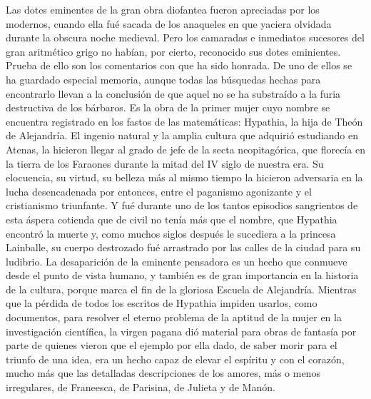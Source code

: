 \documentclass[a4paper, 12pt, draft]{article}
\begin{document}
{%






Las dotes eminentes de la gran obra diofantea fueron apreciadas por los modernos, cuando ella fué sacada de los anaqueles en que yaciera olvidada durante la obscura noche medieval. Pero los camaradas e inmediatos sucesores del gran aritmético grigo no habían, por cierto, reconocido sus dotes eminientes. Prueba de ello son los comentarios con que ha sido honrada. De uno de ellos se ha guardado especial memoria, aunque todas las búsquedas hechas para encontrarlo llevan a la conclusión de que aquel no se ha substraído a la furia destructiva de los bárbaros. Es la obra de la primer mujer cuyo nombre se encuentra registrado en los fastos de las matemáticas: Hypathia, la hija de Theón de Alejandría. El ingenio natural y la amplia cultura que adquirió estudiando en Atenas, la hicieron llegar al grado de jefe de la secta neopitagórica, que florecía en la tierra de los Faraones durante la mitad del IV siglo de nuestra era. Su elocuencia, su virtud, su belleza
más al mismo tiempo la hicieron adversaria 
en la lucha desencadenada por entonces, entre el paganismo agonizante y el cristianismo triunfante. Y fué durante uno de los tantos episodios sangrientos de esta áspera cotienda que de civil no tenía más que el nombre, que Hypathia encontró la muerte y, como muchos siglos después le sucediera a la princesa Lainballe, su cuerpo destrozado fué arrastrado por las calles de la ciudad para su ludibrio.
 La desaparición de la eminente pensadora es un
hecho que conmueve desde el punto de vista humano, y también es de gran importancia en la historia de la cultura, porque marca el fin de la gloriosa Escuela de Alejandría. Mientras que la pérdida de todos los escritos de Hypathia impiden usarlos, como documentos, para resolver el eterno problema de la aptitud de la mujer en la investigación científica, la virgen pagana dió material para obras de fantasía por parte de quienes vieron que el ejemplo por ella dado, de saber morir para el triunfo de una idea, era un hecho capaz de elevar el espíritu y con el corazón, mucho más que las detalladas descripciones de los amores, más o menos irregulares, de Franeesca, de Parisina, de Julieta y de Manón.



}
\end{document}
